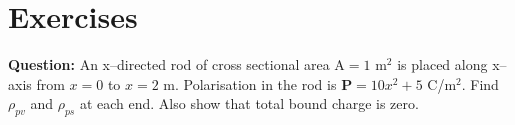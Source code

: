 \documentclass[12pt,a4paper]{article}
\begin{document}
\section{Exercises}
\noindent\textbf{Question:} An x--directed rod of cross sectional area $\mathrm{A}=1$ m$^2$ is placed along x--axis from $x=0$ to $x=2$ m. Polarisation in the rod is $\mathrm{\textbf{P}}=10x^2+5$ C/m$^2$. Find $\rho_{pv}$ and $\rho_{ps}$ at each end. Also show that total bound charge is zero.\\[0.2cm]
%
%
\end{document}

